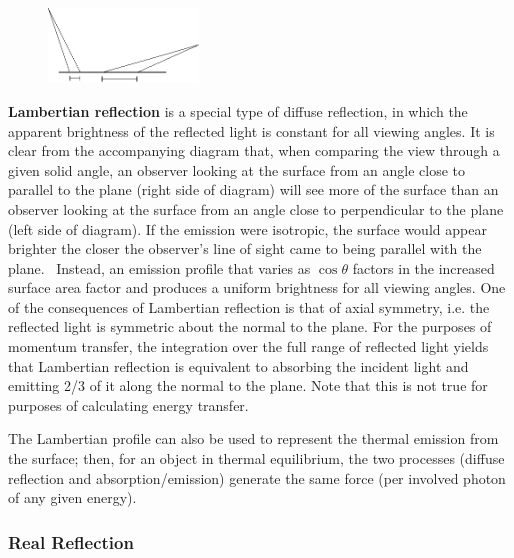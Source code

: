      \begin{figure}
     \includegraphics[width = 40mm]{figs/sda/3_sda.jpg}
     \end{figure}
     \textbf{Lambertian reflection} is a special type of
     diffuse reflection, in which the apparent brightness of the reflected
     light is constant for all viewing angles.  It is clear from the
     accompanying diagram that, when comparing the view
     through a given solid angle, an observer looking at the surface from
     an angle close to
     parallel to the plane (right side of diagram) will see more of the surface
     than an observer
     looking at the surface from an angle close to perpendicular to the plane
     (left side of diagram). If the
     emission were isotropic, the surface would appear brighter the closer
     the observer's line of sight came to being parallel
     with the plane. \ Instead, an emission profile that varies as
     $\cos \theta$ factors in the increased surface area factor
     and produces a uniform brightness for all viewing angles. One of the
     consequences of Lambertian reflection is that of axial symmetry, i.e.
     the reflected light is symmetric about the normal to the plane. For
     the purposes of momentum transfer, the integration over the full range
     of reflected light yields that Lambertian reflection is equivalent to
     absorbing the incident light and emitting 2/3 of it along the normal to
     the plane. Note that this is not true for purposes of calculating
     energy transfer. \par

     The Lambertian profile can also be used to represent the thermal
     emission from the surface; then, for an object in thermal equilibrium,
     the two processes (diffuse reflection and absorption/emission) generate
     the same force (per involved photon of any given energy).

      \subsubsection{Real Reflection} \bigskip

